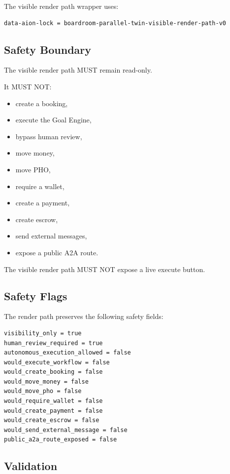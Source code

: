 The visible render path wrapper uses:

\begin{verbatim}
data-aion-lock = boardroom-parallel-twin-visible-render-path-v0
\end{verbatim}

\subsection{Safety Boundary}

The visible render path MUST remain read-only.

It MUST NOT:

\begin{itemize}
  \item create a booking,
  \item execute the Goal Engine,
  \item bypass human review,
  \item move money,
  \item move PHO,
  \item require a wallet,
  \item create a payment,
  \item create escrow,
  \item send external messages,
  \item expose a public A2A route.
\end{itemize}

The visible render path MUST NOT expose a live execute button.

\subsection{Safety Flags}

The render path preserves the following safety fields:

\begin{verbatim}
visibility_only = true
human_review_required = true
autonomous_execution_allowed = false
would_execute_workflow = false
would_create_booking = false
would_move_money = false
would_move_pho = false
would_require_wallet = false
would_create_payment = false
would_create_escrow = false
would_send_external_message = false
public_a2a_route_exposed = false
\end{verbatim}

\subsection{Validation}

